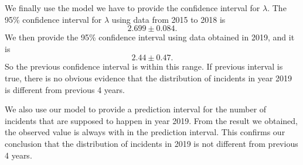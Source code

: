 \documentclass[11pt,a4paper,english]{article}
\begin{document}
We finally use the model we have to provide the confidence interval for $\lambda$. The 95\% confidence interval for $\lambda$ using data from 2015 to 2018 is 
\[2.699 \pm 0.084.\]
We then provide the 95\% confidence interval using data obtained in 2019, and it is 
\[2.44 \pm 0.47.\]
So the previous confidence interval is within this range. If previous interval is true, there is no obvious evidence that the distribution of incidents in year 2019 is different from previous 4 years.

We also use our model to provide a prediction interval for the number of incidents that are supposed to happen in year 2019. From the result we obtained, the observed value is always with in the prediction interval. This confirms our conclusion that the distribution of incidents in 2019 is not different from previous 4 years.



\end{document}
